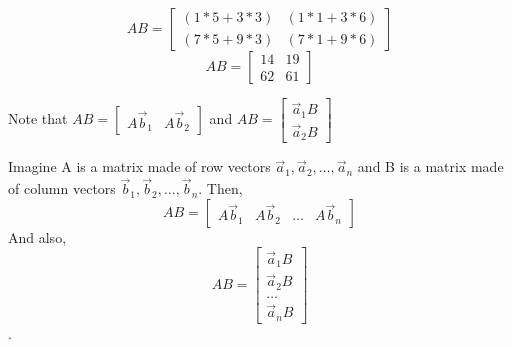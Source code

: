 \begin{enumerate}
{  $$AB = \begin{bmatrix} (1*5 + 3*3) & (1*1 + 3*6)\\(7*5 + 9*3) & (7*1 + 9*6) \end{bmatrix}$$
  $$AB = \begin{bmatrix} 14 & 19 \\ 62 & 61 \end{bmatrix}$$

  Note that $AB = \begin{bmatrix} A\vec{b}_1 & A\vec{b}_2 \end{bmatrix}$ and $AB = \begin{bmatrix} \vec{a}_1 B \\ \vec{a}_2 B \end{bmatrix}$

  Imagine A is a matrix made of row vectors $\vec{a}_1, \vec{a}_2, \dots, \vec{a}_n$ and B is a matrix made of column vectors $\vec{b}_1, \vec{b}_2, \dots, \vec{b}_n$. Then, $$AB = \begin{bmatrix} A\vec{b}_1 & A\vec{b}_2 & \dots & A\vec{b}_n \end{bmatrix}$$ And also, $$AB = \begin{bmatrix} \vec{a}_1 B \\ \vec{a}_2 B \\ \dots \\ \vec{a}_n B \end{bmatrix}$$.
}

\end{enumerate}
\newpage
